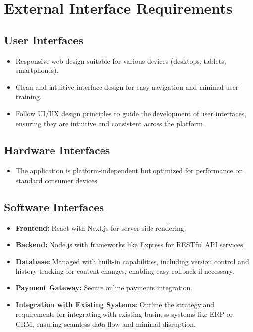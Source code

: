 \documentclass[11pt]{article}
\begin{document}
	\section*{External Interface Requirements}
	
	\subsection*{User Interfaces}
	\begin{itemize}
		\item Responsive web design suitable for various devices (desktops, tablets, smartphones).
		\item Clean and intuitive interface design for easy navigation and minimal user training.
		\item Follow UI/UX design principles to guide the development of user interfaces, ensuring they are intuitive and consistent across the platform.
	\end{itemize}
	
	\subsection*{Hardware Interfaces}
	\begin{itemize}
		\item The application is platform-independent but optimized for performance on standard consumer devices.
	\end{itemize}
	
	\subsection*{Software Interfaces}
	\begin{itemize}
		\item \textbf{Frontend:} React with Next.js for server-side rendering.
		\item \textbf{Backend:} Node.js with frameworks like Express for RESTful API services.
		\item \textbf{Database:} Managed with built-in capabilities, including version control and history tracking for content changes, enabling easy rollback if necessary.
		\item \textbf{Payment Gateway:} Secure online payments integration.
		\item \textbf{Integration with Existing Systems:} Outline the strategy and requirements for integrating with existing business systems like ERP or CRM, ensuring seamless data flow and minimal disruption.
	\end{itemize}
	
\end{document}
